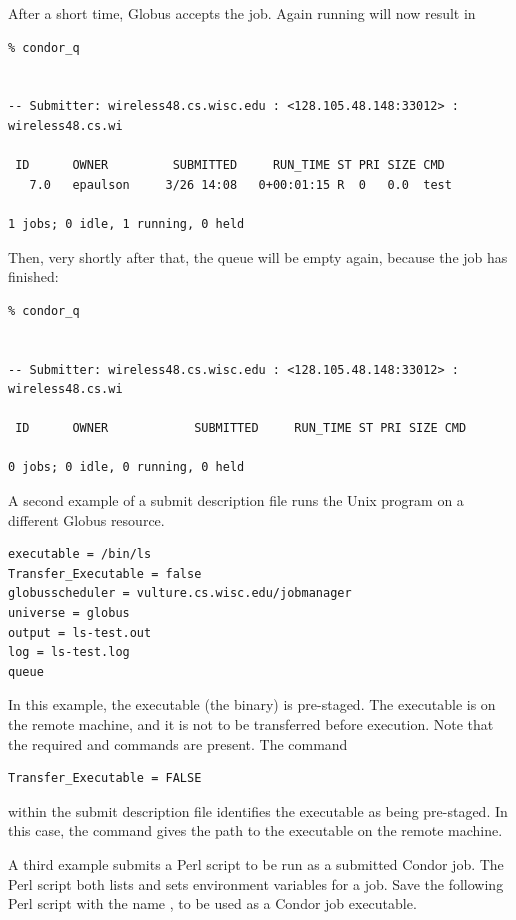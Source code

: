 After a short time, Globus accepts the job.
Again running  will now result in

\footnotesize
\begin{verbatim}
% condor_q


-- Submitter: wireless48.cs.wisc.edu : <128.105.48.148:33012> : wireless48.cs.wi

 ID      OWNER         SUBMITTED     RUN_TIME ST PRI SIZE CMD
   7.0   epaulson     3/26 14:08   0+00:01:15 R  0   0.0  test

1 jobs; 0 idle, 1 running, 0 held
\end{verbatim}
\normalsize

Then, very shortly after that, the queue will be empty again,
because the job has finished:

\footnotesize
\begin{verbatim}
% condor_q


-- Submitter: wireless48.cs.wisc.edu : <128.105.48.148:33012> : wireless48.cs.wi

 ID      OWNER            SUBMITTED     RUN_TIME ST PRI SIZE CMD

0 jobs; 0 idle, 0 running, 0 held
\end{verbatim}
\normalsize


A second example of a submit description file runs the Unix 
program on a different Globus resource.

\footnotesize
\begin{verbatim}
executable = /bin/ls
Transfer_Executable = false
globusscheduler = vulture.cs.wisc.edu/jobmanager
universe = globus
output = ls-test.out
log = ls-test.log
queue
\end{verbatim} 
\normalsize

In this example, the executable (the binary) is pre-staged.
The executable is on the remote machine, and it is not to
be transferred before execution.
Note that the required 
 and 
commands are present.
The command
\begin{verbatim}
Transfer_Executable = FALSE
\end{verbatim}
within the submit description file identifies the executable
as being pre-staged.
In this case, the 
command gives the path to the executable on the remote machine.

A third example submits a Perl script to be run as a submitted
Condor job.
The Perl script both lists and sets
environment variables for a job.
Save the following Perl script with the name ,
to be used as a Condor job executable.

